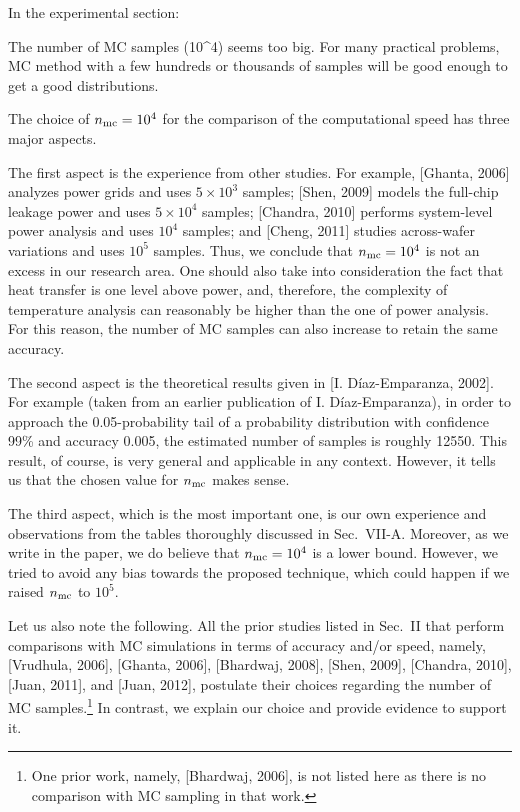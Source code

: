 \begin{reviewer}
In the experimental section:

\vspace{0.5em}
\noindent[Comment 8] The number of MC samples (10\^{}4) seems too big. For many practical problems, MC method with a few hundreds or thousands of samples will be good enough to get a good distributions.
\end{reviewer}
\begin{authors}
The choice of ${n_\text{mc}} = 10^4$ for the comparison of the computational speed has three major aspects.

The first aspect is the experience from other studies.
For example, [Ghanta, 2006] analyzes power grids and uses $5 \times 10^3$ samples; [Shen, 2009] models the full-chip leakage power and uses $5 \times 10^4$ samples; [Chandra, 2010] performs system-level power analysis and uses $10^4$ samples; and [Cheng, 2011] studies across-wafer variations and uses $10^5$ samples.
Thus, we conclude that ${n_\text{mc}} = 10^4$ is not an excess in our research area.
One should also take into consideration the fact that heat transfer is one level above power, and, therefore, the complexity of temperature analysis can reasonably be higher than the one of power analysis.
For this reason, the number of MC samples can also increase to retain the same accuracy.

The second aspect is the theoretical results given in [I. D\'{i}az-Emparanza, 2002].
For example (taken from an earlier publication of I. D\'{i}az-Emparanza), in order to approach the 0.05-probability tail of a probability distribution with confidence 99\% and accuracy 0.005, the estimated number of samples is roughly 12550.
This result, of course, is very general and applicable in any context.
However, it tells us that the chosen value for ${n_\text{mc}}$ makes sense.

The third aspect, which is the most important one, is our own experience and observations from the tables thoroughly discussed in Sec.~VII-A.
Moreover, as we write in the paper, we do believe that ${n_\text{mc}} = 10^4$ is a lower bound.
However, we tried to avoid any bias towards the proposed technique, which could happen if we raised ${n_\text{mc}}$ to $10^5$.

Let us also note the following.
All the prior studies listed in Sec.~II that perform comparisons with MC simulations in terms of accuracy and/or speed, namely, [Vrudhula, 2006], [Ghanta, 2006], [Bhardwaj, 2008], [Shen, 2009], [Chandra, 2010], [Juan, 2011], and [Juan, 2012], postulate their choices regarding the number of MC samples.\footnote{One prior work, namely, [Bhardwaj, 2006], is not listed here as there is no comparison with MC sampling in that work.}
In contrast, we explain our choice and provide evidence to support it.

\begin{actions}
\end{actions}
\end{authors}

